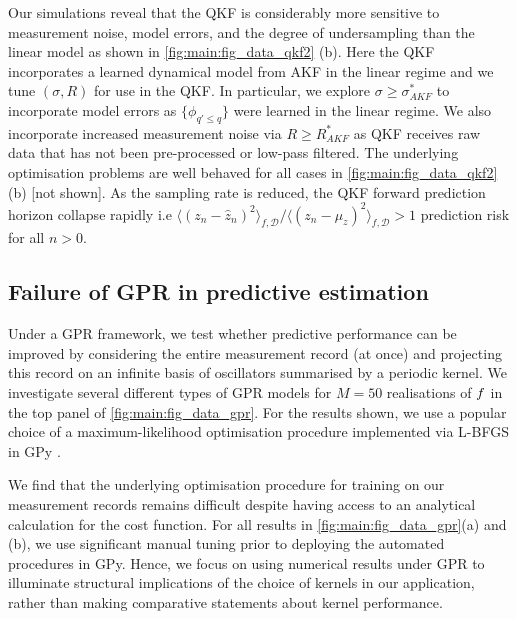 Our simulations reveal that the QKF is considerably more sensitive to measurement noise, model errors, and the degree of undersampling than the linear model as shown in \cref{fig:main:fig_data_qkf2} (b). Here the QKF incorporates a learned dynamical model from AKF in the linear regime and we tune $(\sigma, R)$ for use in the QKF.  In particular, we explore $\sigma \geq \sigma_{AKF}^*$ to incorporate model errors as $\{\phi_{q' \leq q}\}$ were learned in the linear regime.  We also incorporate increased measurement noise via $R \geq R_{AKF}^*$ as QKF receives raw data that has not been pre-processed or low-pass filtered. The underlying optimisation problems are well behaved for all cases in \cref{fig:main:fig_data_qkf2}(b) [not shown].  As the sampling rate is reduced, the QKF forward prediction horizon collapse rapidly i.e $\langle (z_n - \hat{z}_n)^2 \rangle_{f, \mathcal{D}} / \langle (z_n - \mu_z)^2 \rangle_{f, \mathcal{D}} > 1 $ prediction risk for all $n>0$.  




\subsection{Failure of GPR in predictive estimation} 
Under a GPR framework, we test whether predictive performance can be improved by considering the entire measurement record (at once) and projecting this record on an infinite basis of oscillators summarised by a periodic kernel. We investigate several different types of GPR models for $M=50$ realisations of $f$ in the top panel of \cref{fig:main:fig_data_gpr}. For the results shown, we use a popular choice of a maximum-likelihood optimisation procedure implemented via L-BFGS in GPy \cite{gpy2014}.

We find that the underlying optimisation procedure for training on our measurement records remains difficult despite having access to an analytical calculation for the cost function. For all results in \cref{fig:main:fig_data_gpr}(a) and (b), we use significant manual tuning prior to deploying the automated procedures in GPy. Hence, we focus on using numerical results under GPR to illuminate structural implications of the choice of kernels in our application, rather than making comparative statements about kernel performance.
 
